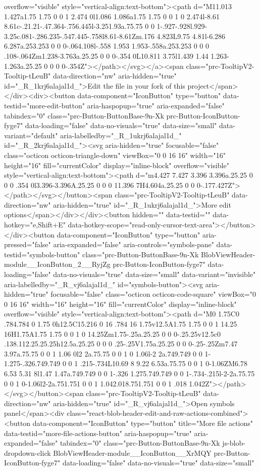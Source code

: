 {{{{{{{overflow="visible" style="vertical-align:text-bottom"><path d="M11.013 1.427a1.75 1.75 0 0 1 2.474 0l1.086 1.086a1.75 1.75 0 0 1 0 2.474l-8.61 8.61c-.21.21-.47.364-.756.445l-3.251.93a.75.75 0 0 1-.927-.928l.929-3.25c.081-.286.235-.547.445-.758l8.61-8.61Zm.176 4.823L9.75 4.81l-6.286 6.287a.253.253 0 0 0-.064.108l-.558 1.953 1.953-.558a.253.253 0 0 0 .108-.064Zm1.238-3.763a.25.25 0 0 0-.354 0L10.811 3.75l1.439 1.44 1.263-1.263a.25.25 0 0 0 0-.354Z"></path></svg></a><span class="prc-TooltipV2-Tooltip-tLeuB" data-direction="nw" aria-hidden="true" id="_R_1krj6alajal1d_">Edit the file in your fork of this project</span></div><div><button data-component="IconButton" type="button" data-testid="more-edit-button" aria-haspopup="true" aria-expanded="false" tabindex="0" class="prc-Button-ButtonBase-9n-Xk prc-Button-IconButton-fyge7" data-loading="false" data-no-visuals="true" data-size="small" data-variant="default" aria-labelledby="_R_1ukrj6alajal1d_" id="_R_2krj6alajal1d_"><svg aria-hidden="true" focusable="false" class="octicon octicon-triangle-down" viewBox="0 0 16 16" width="16" height="16" fill="currentColor" display="inline-block" overflow="visible" style="vertical-align:text-bottom"><path d="m4.427 7.427 3.396 3.396a.25.25 0 0 0 .354 0l3.396-3.396A.25.25 0 0 0 11.396 7H4.604a.25.25 0 0 0-.177.427Z"></path></svg></button><span class="prc-TooltipV2-Tooltip-tLeuB" data-direction="nw" aria-hidden="true" id="_R_1ukrj6alajal1d_">More edit options</span></div></div><button hidden="" data-testid="" data-hotkey="e,Shift+E" data-hotkey-scope="read-only-cursor-text-area"></button></div><button data-component="IconButton" type="button" aria-pressed="false" aria-expanded="false" aria-controls="symbols-pane" data-testid="symbols-button" class="prc-Button-ButtonBase-9n-Xk BlobViewHeader-module__IconButton_2__RyjZg prc-Button-IconButton-fyge7" data-loading="false" data-no-visuals="true" data-size="small" data-variant="invisible" aria-labelledby="_R_vj6alajal1d_" id="symbols-button"><svg aria-hidden="true" focusable="false" class="octicon octicon-code-square" viewBox="0 0 16 16" width="16" height="16" fill="currentColor" display="inline-block" overflow="visible" style="vertical-align:text-bottom"><path d="M0 1.75C0 .784.784 0 1.75 0h12.5C15.216 0 16 .784 16 1.75v12.5A1.75 1.75 0 0 1 14.25 16H1.75A1.75 1.75 0 0 1 0 14.25Zm1.75-.25a.25.25 0 0 0-.25.25v12.5c0 .138.112.25.25.25h12.5a.25.25 0 0 0 .25-.25V1.75a.25.25 0 0 0-.25-.25Zm7.47 3.97a.75.75 0 0 1 1.06 0l2 2a.75.75 0 0 1 0 1.06l-2 2a.749.749 0 0 1-1.275-.326.749.749 0 0 1 .215-.734L10.69 8 9.22 6.53a.75.75 0 0 1 0-1.06ZM6.78 6.53 5.31 8l1.47 1.47a.749.749 0 0 1-.326 1.275.749.749 0 0 1-.734-.215l-2-2a.75.75 0 0 1 0-1.06l2-2a.751.751 0 0 1 1.042.018.751.751 0 0 1 .018 1.042Z"></path></svg></button><span class="prc-TooltipV2-Tooltip-tLeuB" data-direction="nw" aria-hidden="true" id="_R_vj6alajal1d_">Open symbols panel</span><div class="react-blob-header-edit-and-raw-actions-combined"><button data-component="IconButton" type="button" title="More file actions" data-testid="more-file-actions-button" aria-haspopup="true" aria-expanded="false" tabindex="0" class="prc-Button-ButtonBase-9n-Xk js-blob-dropdown-click BlobViewHeader-module__IconButton__XrMQY prc-Button-IconButton-fyge7" data-loading="false" data-no-visuals="true" data-size="small" }}}}}}}
